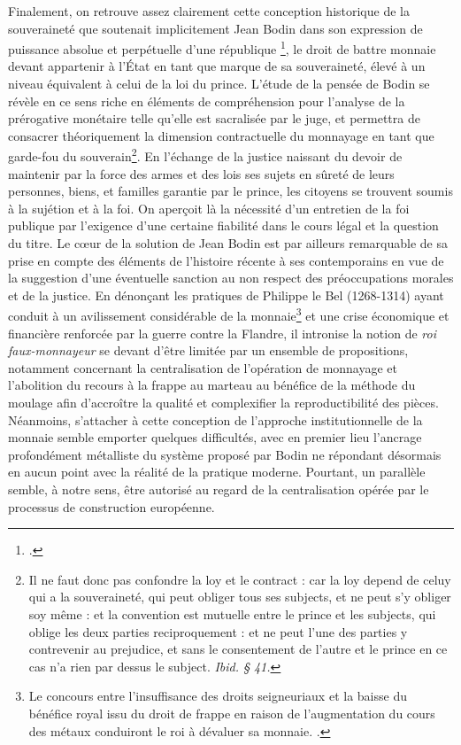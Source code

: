 {Finalement, on retrouve assez clairement cette conception historique de la souveraineté que soutenait implicitement Jean Bodin dans son expression de \og puissance absolue et perpétuelle d'une république \fg{}\footnote{.}, le droit de battre monnaie devant appartenir à l'État en tant que marque de sa souveraineté, élevé à un niveau équivalent à celui de la loi du prince. L'étude de la pensée de Bodin se révèle en ce sens riche en éléments de compréhension pour l'analyse de la prérogative monétaire telle qu'elle est sacralisée par le juge, et permettra de consacrer théoriquement la dimension contractuelle du monnayage en tant que garde-fou du souverain\footnote{\og Il ne faut donc pas confondre la loy et le contract : car la loy depend de celuy qui a la souveraineté, qui peut obliger tous ses subjects, et ne peut s'y obliger soy même : et la convention est mutuelle entre le prince et les subjects, qui oblige les deux parties reciproquement : et ne peut l'une des parties y contrevenir au prejudice, et sans le consentement de l'autre et le prince en ce cas n'a rien par dessus le subject\fg{}. \emph{Ibid. \S{} 41.}}. En l'échange de la justice naissant du devoir de \og maintenir par la force des armes et des lois ses sujets en sûreté de leurs personnes, biens, et familles \fg{} garantie par le prince, les citoyens se trouvent soumis à la sujétion et à la foi. On aperçoit là la nécessité d'un entretien de la foi publique par l'exigence d'une certaine fiabilité dans le cours légal et la question du titre. Le c\oe{}ur de la solution de Jean Bodin est par ailleurs remarquable de sa prise en compte des éléments de l'histoire récente à ses contemporains en vue de la suggestion d'une éventuelle sanction au non respect des préoccupations morales et de la justice. En dénonçant les pratiques de Philippe le Bel (1268-1314) ayant conduit à un avilissement considérable de la monnaie\footnote{Le concours entre l'insuffisance des droits seigneuriaux et la baisse du bénéfice royal issu du droit de frappe en raison de l'augmentation du cours des métaux conduiront le roi à dévaluer sa monnaie. .} et une crise économique et financière renforcée par la guerre contre la Flandre, il intronise la notion de \emph{roi faux-monnayeur} se devant d'être limitée par un ensemble de propositions, notamment concernant la centralisation de l'opération de monnayage et l'abolition du recours à la frappe au marteau au bénéfice de la méthode du moulage afin d'accroître la qualité et complexifier la reproductibilité des pièces. Néanmoins, s'attacher à cette conception de l'approche institutionnelle de la monnaie semble emporter quelques difficultés, avec en premier lieu l'ancrage profondément métalliste du système proposé par Bodin ne répondant désormais en aucun point avec la réalité de la pratique moderne. Pourtant, un parallèle semble, à notre sens, être autorisé au regard de la centralisation opérée par le processus de construction européenne.\par

}
